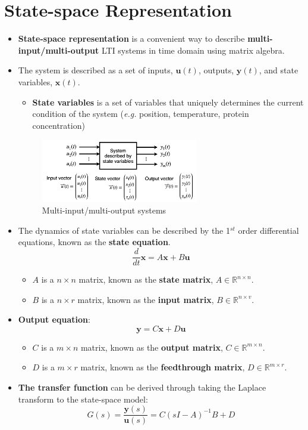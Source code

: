 \section{State-space Representation}
\begin{itemize}
  \item \textbf{State-space representation} is a convenient way to describe \textbf{multi-input/multi-output} LTI systems in time domain using matrix algebra.
  
  \item The system is described as a set of inputs, $\mathbf{u}(t)$, outputs, $\mathbf{y}(t)$, and state variables, $\mathbf{x}(t)$.
  \begin{itemize}
    \item \textbf{State variables} is a set of variables that uniquely determines the current condition of the system (\textit{e.g.} position, temperature, protein concentration)
 \end{itemize}

    \begin{figure}[H] 
        \centering
        \includegraphics[width=0.65\textwidth]{images/multi_io.png}
        \caption{Multi-input/multi-output systems}
    \end{figure}

  \item The dynamics of state variables can be described by the 1$^{st}$ order differential equations, known as the \textbf{state equation}.
    \[\frac{d}{dt}\mathbf{x} = A\mathbf{x}+B\mathbf{u}\]
  \begin{itemize}
        \item $A$ is a $n\times n$ matrix, known as the \textbf{state matrix}, $ A \in \mathbb{R}^{n\times n}$.
        \item $B$ is a $n \times r$ matrix, known as the \textbf{input matrix}, $B \in \mathbb{R}^{n\times v}$.
  \end{itemize}
  
  \item \textbf{Output equation}: 
   \[\mathbf{y} = C\mathbf{x}+D\mathbf{u}\]
  \begin{itemize}
        \item $C$ is a $m\times n$ matrix, known as the \textbf{output matrix}, $ C \in \mathbb{R}^{m\times n}$.
        \item $D$ is a $m \times r$ matrix, known as the \textbf{feedthrough matrix}, $D \in \mathbb{R}^{m\times r}$.
  \end{itemize}
  
  \item \textbf{The transfer function} can be derived through taking the Laplace transform to the state-space model:
  \[G(s) = \frac{\mathbf{y}(s)}{\mathbf{u}(s)} = C(sI-A)^{-1}B+D\]
\end{itemize}
